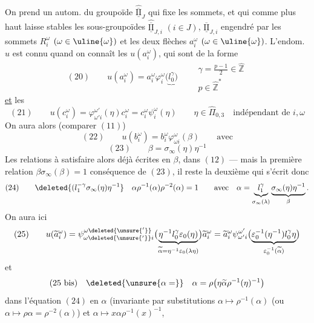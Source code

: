 On prend un autom.  du groupoïde $\widehat{\overline{\underline{\mathrm{II}}}}_J$ qui  fixe les sommets, et qui comme plus haut laisse stables les sous-groupoïdes $\widehat{\overline{\underline{\mathrm{II}}}}_{J,i}$ $(i\in J)$,  $\overline{\underline{\mathrm{II}}}_{J,i}$ engendré par les  sommets $R_i^\omega$ $(\omega\in\uline{\omega})$ et les deux flèches $a_i^\omega$ $(\omega\in\uline{\omega})$.
 L'endom. $u$ est connu quand on connaît les $u(a_i^\omega)$, qui sont de la forme
\[
(20)\qquad u(a_i^\omega)=a_i^\omega\varphi_i^\omega\bigl(\underbrace{l_0^\gamma}\bigr)
\qquad\begin{array}{l}\gamma=\frac{p-1}{2}\in\widehat{\mathbb Z}\\p\in\widehat{\mathbb Z}^{*}\end{array}
\]
\uline{et} les
\[
(21)\qquad u(c_i^\omega)=\varphi_{\omega'i}^{\omega'}(\eta)c_i^\omega=c_i^\omega\psi_i^\omega(\eta)
\qquad\eta\in\widehat\Pi_{0,3}\quad\text{indépendant de }i,\omega
\]
On aura alors (comparer $(11)$)
\[
(22)\qquad u(b_i^\omega)=b_i^\omega\varphi_{\omega i}^\omega(\beta)\qquad\text{avec}
\]
\[
(23)\qquad\beta=\sigma_\infty(\eta)\eta^{-1}
\]
Les relations à satisfaire  alors déjà écrites en  $\beta$,  dans $(12)$ --- mais la première relation $\beta\sigma_\infty(\beta)=1$ conséquence de $(23)$, il reste la deuxième qui s'écrit donc
\[
(24)\qquad\deleted{(l_1^{-\gamma}\sigma_\infty(\eta)\eta^{-1}}
\quad\alpha\rho^{-1}(\alpha)\rho^{-2}(\alpha)=1
\qquad\text{avec}\quad\alpha=\underbrace{l_1^\gamma}_{\sigma_\infty(\lambda)}\underbrace{\sigma_\infty(\eta)\eta^{-1}}_\beta.
\]
On aura ici
\[
(25)\qquad
u(\widetilde a_i^\omega)=\psi_{\omega\deleted{\unsure{'}}i}^{\omega\deleted{\unsure{'}}}\bigl(\underbrace{\eta^{-1}l_0^\gamma\varepsilon_0(\eta)}_{\widetilde\alpha=\eta^{-1}\varepsilon_0(\lambda\eta)}\bigr)\widetilde a_i^\omega
=\widetilde a_i^\omega\psi_{\omega'i}^{\omega'}\bigl(\underbrace{\varepsilon_0^{-1}(\eta^{-1})l_0^\gamma\eta}_{\varepsilon_0^{-1}(\widetilde\alpha)}\bigr)
\]
et
\[
(25\text{ bis})\quad\deleted{\unsure{\alpha=}}\quad\alpha=\rho\bigl(\eta\widetilde\alpha\rho^{-1}(\eta)^{-1}\bigr)
\]
 dans l'équation $(24)$ en $\alpha$ (invariante par substitutions $\alpha\mapsto\rho^{-1}(\alpha)$ (ou $\alpha\mapsto\rho\alpha=\rho^{-2}(\alpha)$) et $\alpha\mapsto x\alpha\rho^{-1}(x)^{-1}$,

